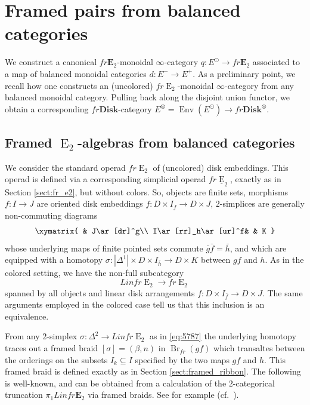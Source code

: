 \documentclass[reqno]{amsart}
\theoremstyle{definition}
\newcommand{\opn}[1]{\operatorname{#1}}
\newcommand{\ot}{\otimes}
\newcommand{\E}{\mathbf{E}}
\newcommand{\Disk}{\mathbf{Disk}}
\renewcommand{\1}{\mathbf{1}}
\begin{document}
\section{Framed pairs from balanced categories}
\label{sect:framed_pairs}

We construct a canonical $fr\E_2$-monoidal $\infty$-category $q:E^{\odot}\to fr\E_2$ associated to a map of balanced monoidal categories $d:E^{-}\to E^+$. As a preliminary point, we recall how one constructs an (uncolored) $fr\opn{E}_2$-monoidal $\infty$-category from any balanced monoidal category. Pulling back along the disjoint union functor, we obtain a corresponding $fr\Disk$-category $E^{\ot}=\opn{Env}(E^{\odot})\to fr\Disk^{\ot}$.

\subsection{Framed $\opn{E}_2$-algebras from balanced categories}

We consider the standard operad $fr\opn{E}_2$ of (uncolored) disk embeddings.  This operad is defined via a corresponding simplicial operad $fr\underline{\opn{E}}_2$, exactly as in Section \ref{sect:fr_e2}, but without colors.  So, objects are finite sets, morphisms $f:I\to J$ are oriented disk embeddings $f:D\times I_{f}\to D\times J$, $2$-simplices are generally non-commuting diagrams
\begin{equation}\label{eq:5787}
\xymatrix{
	& J\ar[dr]^g\\
I\ar[rr]_h\ar[ur]^f& & K
}
\end{equation}
whose underlying maps of finite pointed sets commute $\bar{g}\bar{f}=\bar{h}$, and which are equipped with a homotopy $\sigma:|\Delta^1|\times D\times I_{\bar{h}}\to D\times K$ between $gf$ and $h$.  As in the colored setting, we have the non-full subcategory
\[
Linfr\opn{E}_2\to fr\opn{E}_2
\]
spanned by all objects and linear disk arrangements $f:D\times I_{\bar{f}}\to D\times J$.  The same arguments employed in the colored case tell us that this inclusion is an equivalence.
\par

From any $2$-simplex $\sigma:\Delta^2\to Linfr\opn{E}_2$ as in \eqref{eq:5787} the underlying homotopy traces out a framed braid $[\sigma]=(\beta,n)$ in $\opn{Br}_{fr}(gf)$ which transaltes between the orderings on the subsets $I_k\subseteq I$ specified by the two maps $gf$ and $h$.  This framed braid is defined exactly as in Section \ref{sect:framed_ribbon}.  The following is well-known, and can be obtained from a calculation of the $2$-categorical truncation $\pi_1 Linfr\E_2$ via framed braids.  See for example \cite[Definition 7.1, Propositions 7.4 and 7.6]{salvatorewahl03} (cf.\ \cite[Proposition 6.2.2]{fresse17}).
\end{document}
